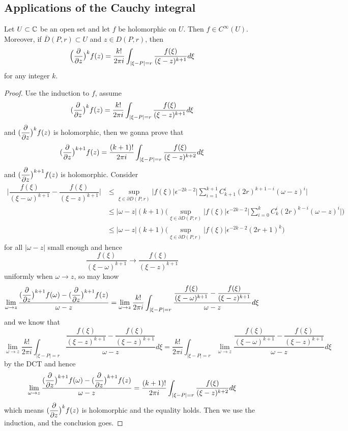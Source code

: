 \subsection*{Applications of the Cauchy integral}
\begin{theorem}
    Let $U\subset \mathbb{C}$ be an open set and let $f$ be holomorphic on $U$. Then $f\in C^{\infty}(U)$. Moreover, if $\overline{D}(P,r)\subset U$ and $z\in D(P,r)$, then
    \[
    \Big(\dfrac{\partial}{\partial z} \big)^k f(z) = \dfrac{k!}{2\pi i}\int_{|\xi-P|=r}\dfrac{f(\xi)}{(\xi-z)^{k+1}}d\xi
    \]
    for any integer $k$.
\end{theorem}
\begin{proof}\par
    Use the induction to $f$, assume
    \[
    (\dfrac{\partial}{\partial z} \big)^k f(z) = \dfrac{k!}{2\pi i}\int_{|\xi-P|=r}\dfrac{f(\xi)}{(\xi-z)^{k+1}}d\xi
    \]
    and $(\dfrac{\partial}{\partial z} \big)^k f(z)$ is holomorphic, then we gonna prove that
    \[
    (\dfrac{\partial}{\partial z} \big)^{k+1} f(z) = \dfrac{(k+1)!}{2\pi i}\int_{|\xi-P|=r}\dfrac{f(\xi)}{(\xi-z)^{k+2}}d\xi
    \]
    and $(\dfrac{\partial}{\partial z} \big)^{k+1} f(z)$ is holomorphic. Consider
    \[
    \begin{aligned}
    \Big|\dfrac{f(\xi)}{(\xi-\omega)^{k+1}}-
    \dfrac{f(\xi)}{(\xi-z)^{k+1}}\Big| &\leq \sup_{\xi\in \partial D(P,r)}|f(\xi)| \epsilon^{-2k-2}\Big|\sum\limits_{i=1}^{k+1} C_{k+1}^{i}(2r)^{k+1-i}(\omega-z)^i\Big| \\
    & \leq |\omega-z|(k+1)\Big(\sup_{\xi\in \partial D(P,r)}|f(\xi)| \epsilon^{-2k-2}\Big|\sum\limits_{i=0}^{k} C_{k}^{i}(2r)^{k-i}(\omega-z)^i\Big|\Big)\\
    & \leq |\omega-z|(k+1)\Big(\sup_{\xi\in \partial D(P,r)}|f(\xi)| \epsilon^{-2k-2}(2r+1)^k\Big)
    \end{aligned}
    \]
    for all $|\omega-z|$ small enough and hence
    \[
    \dfrac{f(\xi)}{(\xi-\omega)^{k+1}} \to 
    \dfrac{f(\xi)}{(\xi-z)^{k+1}}
    \]
    uniformly when $\omega \to z$, so may know
    \[
    \lim_{\omega \to z} \dfrac{(\dfrac{\partial}{\partial z} \big)^{k+1} f(\omega) - (\dfrac{\partial}{\partial z} \big)^{k+1} f(z)}{\omega - z} = \lim_{\omega \to z} \dfrac{k!}{2\pi i}\int_{|\xi-P|=r}\dfrac{\dfrac{f(\xi)}{(\xi-\omega)^{k+1}}-\dfrac{f(\xi)}{(\xi-z)^{k+1}}}{\omega - z}d\xi
    \]
    and we know that
    \[
    \lim_{\omega \to z} \dfrac{k!}{2\pi i}\int_{|\xi-P|=r}\dfrac{\dfrac{f(\xi)}{(\xi-z)^{k+1}}-\dfrac{f(\xi)}{(\xi-z)^{k+1}}}{\omega - z}d\xi =  \dfrac{k!}{2\pi i}\int_{|\xi-P|=r}\lim_{\omega \to z}\dfrac{\dfrac{f(\xi)}{(\xi-\omega)^{k+1}}-\dfrac{f(\xi)}{(\xi-z)^{k+1}}}{\omega - z}d\xi
    \]
    by the DCT and hence
    \[
    \lim_{\omega \to z} \dfrac{(\dfrac{\partial}{\partial z} \big)^{k+1} f(\omega) - (\dfrac{\partial}{\partial z} \big)^{k+1} f(z)}{\omega - z}
    = \dfrac{(k+1)!}{2\pi i}\int_{|\xi-P|=r}\dfrac{f(\xi)}{(\xi-z)^{k+2}}d\xi
    \]
    which means $(\dfrac{\partial}{\partial z} \big)^k f(z)$ is holomorphic and the equality holds. Then we use the induction, and the conclusion goes.
\end{proof}

